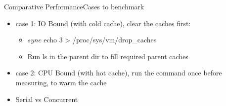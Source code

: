 \documentclass[17pt]{beamer}
\begin{document}
\begin{frame}[fragile]{Comparative Performance}{Cases to benchmark}

\begin{itemize}
  \item case 1: IO Bound (with cold cache), clear the caches first:
\begin{itemize}
\item
\begin{code}
$ sync
$ echo 3 > /proc/sys/vm/drop_caches
\end{code}
  \item Run ls in the parent dir to fill required parent caches
\end{itemize}
  \item case 2: CPU Bound (with hot cache), run the command once before
  measuring, to warm the cache
  \item Serial vs Concurrent
\end{itemize}

\end{frame}
\end{document}
